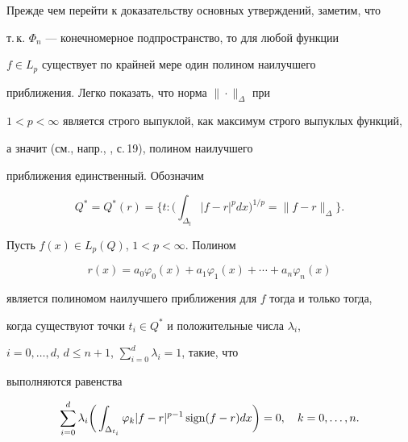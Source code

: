 Прежде чем перейти к доказательству основных утверждений, заметим, что 


т.\,к. $\Phi_n$ --- конечномерное подпространство, то для любой функции 


$f\in L_p$ существует по крайней мере один полином наилучшего 


приближения. Легко показать, что норма $\|\cdot\|_\Delta$ при 


$1<p<\infty$ является строго выпуклой, как максимум строго выпуклых функций,


а значит (см., напр., \cite{2}, с.\,19), полином наилучшего 


приближения единственный. Обозначим 


$$ 


Q^*=Q^*(r)=\bigg\{t:\bigg(\int_{\Delta_t}|f-r|^p dx 


\bigg)^{1/p}=\|f-r\|_\Delta\bigg\}. 


$$ 


 


\begin{thm} 


Пусть $f(x)\in L_p(Q)$, $1<p<\infty$. Полином 


$$ 


r(x)=a_0\varphi_0(x)+a_1\varphi_1(x)+\dotsb+ 


a_n\varphi_n(x) 


$$ 


является полиномом наилучшего приближения для $f$ тогда и только тогда, 


когда существуют точки $t_i\in Q^*$ и положительные числа $\lambda_i$, 


$i=0,\dotsc,d$, $d\le n+1$, $\sum\limits^d_{i=0}\lambda_i=1$, такие, что 


выполняются равенства 


\begin{equation} 


\sum^d_{i=0}\lambda_i\bigg(\int_{\Delta_{t_i}} 


\varphi_k|f-r|^{p-1}\sign(f-r)dx\bigg)=0,\quad k=0,\dotsc,n. 


\end{equation} 


\end{thm} 


 


